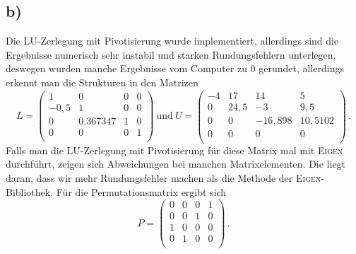 \subsection{b)}
Die LU-Zerlegung mit Pivotisierung wurde implementiert, allerdings sind die Ergebnisse
numerisch sehr instabil und starken Rundungsfehlern unterlegen,
deswegen wurden manche Ergebnisse vom Computer zu 0 gerundet,
allerdings erkennt man die Strukturen in den Matrizen
\begin{equation}
  L =
  \begin{pmatrix}
    1 & 0 & 0 & 0 \\
    -0,5 & 1 & 0 & 0 \\
    0 & 0.367347 & 1 & 0 \\
    0 & 0 & 0 & 1 \\
  \end{pmatrix}
  \ \text{und} \ U =
  \begin{pmatrix}
    -4 & 17 & 14 & 5 \\
    0 & 24,5 & -3 & 9,5 \\
    0 & 0 & -16,898 & 10,5102 \\
    0 & 0 & 0 & 0 \\
  \end{pmatrix} \, .
\end{equation}
Falls man die LU-Zerlegung mit Pivotisierung für diese Matrix mal mit \textsc{Eigen}
durchführt, zeigen sich Abweichungen bei manchen Matrixelementen. Die liegt daran,
dass wir mehr Rundungsfehler machen als die Methode der \textsc{Eigen}-Bibliothek.
Für die Permutationsmatrix ergibt sich
\begin{equation}
  P =
  \begin{pmatrix}
    0 & 0 & 0 & 1 \\
    0 & 0 & 1 & 0 \\
    1 & 0 & 0 & 0 \\
    0 & 1 & 0 & 0 \\
  \end{pmatrix} \, .
\end{equation}

